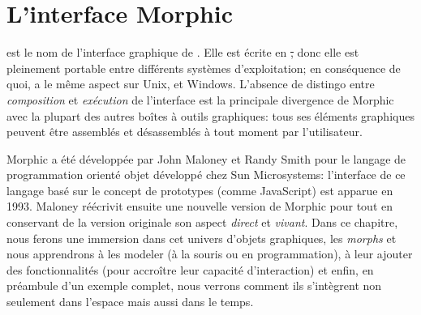 \documentclass[a4paper,10pt,twoside]{book}
\begin{document}
	\sloppy
\fi
\chapter{L'interface Morphic}


%
 est le nom de l'interface graphique de \pharo.
Elle est écrite en \st, donc elle est pleinement portable entre
différents systèmes d'exploitation; en conséquence de quoi, \pharo
a le même aspect sur Unix, \macosx et Windows.
L'absence de distingo entre \emph{composition} et \emph{exécution}
de l'interface est la principale divergence de Morphic avec la plupart
des autres boîtes à outils graphiques: tous ses éléments
graphiques peuvent être assemblés et désassemblés à tout
moment par l'utilisateur.



Morphic a été développée par John Maloney et Randy Smith pour
le langage de programmation orienté objet  développé
chez Sun Microsystems:
l'interface de ce langage basé sur le concept de prototypes (comme
JavaScript) est apparue en 1993.
Maloney réécrivit ensuite une nouvelle version de Morphic pour
\pharo tout en conservant de la version originale son aspect 
\emph{direct} et 
\emph{vivant}.
Dans ce chapitre, nous ferons une immersion dans cet univers d'objets
graphiques, les \emph{morphs} et nous apprendrons à les modeler (à la
souris ou en programmation), à leur ajouter des fonctionnalités (pour
accroître leur capacité d'interaction) et enfin, en préambule
d'un exemple complet, nous verrons comment ils s'intègrent non seulement
dans l'espace mais aussi dans le temps.
\end{document}
